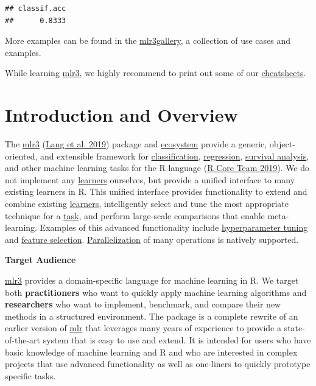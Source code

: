 \documentclass[
]{scrbook}
\newenvironment{Shaded}{\begin{snugshade}}{\end{snugshade}}
\newcommand{\CommentTok}[1]{\textcolor[rgb]{0.56,0.35,0.01}{\textit{#1}}}
\newcommand{\FunctionTok}[1]{\textcolor[rgb]{0.00,0.00,0.00}{#1}}
\newcommand{\NormalTok}[1]{#1}
\newcommand{\SpecialCharTok}[1]{\textcolor[rgb]{0.00,0.00,0.00}{#1}}
\newcommand{\StringTok}[1]{\textcolor[rgb]{0.31,0.60,0.02}{#1}}
\renewenvironment{Shaded} {\begin{snugshade}\small} {\end{snugshade}}
\begin{document}
\begin{Shaded}
\end{Shaded}

\begin{verbatim}
## classif.acc 
##      0.8333
\end{verbatim}

More examples can be found in the \href{https://mlr3gallery.mlr-org.com}{mlr3gallery}, a collection of use cases and examples.

While learning \href{https://mlr3.mlr-org.com}{mlr3}, we highly recommend to print out some of our \href{https://cheatsheets.mlr-org.com}{cheatsheets}.

\hypertarget{introduction}{%
\chapter{Introduction and Overview}\label{introduction}}

The \href{https://mlr3.mlr-org.com}{mlr3} (\protect\hyperlink{ref-mlr3}{Lang et al. 2019}) package and \href{https://github.com/mlr-org/mlr3/wiki/Extension-Packages}{ecosystem} provide a generic, object-oriented, and extensible framework for \protect\hyperlink{tasks}{classification}, \protect\hyperlink{tasks}{regression}, \protect\hyperlink{survival}{survival analysis}, and other machine learning tasks for the R language (\protect\hyperlink{ref-R}{R Core Team 2019}).
We do not implement any \protect\hyperlink{learners}{learners} ourselves, but provide a unified interface to many existing learners in R.
This unified interface provides functionality to extend and combine existing \protect\hyperlink{learners}{learners}, intelligently select and tune the most appropriate technique for a \protect\hyperlink{tasks}{task}, and perform large-scale comparisons that enable meta-learning.
Examples of this advanced functionality include \protect\hyperlink{tuning}{hyperparameter tuning} and \protect\hyperlink{fs}{feature selection}. \protect\hyperlink{parallelization}{Parallelization} of many operations is natively supported.

\textbf{Target Audience}

\href{https://mlr3.mlr-org.com}{mlr3} provides a domain-specific language for machine learning in R.
We target both \textbf{practitioners} who want to quickly apply machine learning algorithms and \textbf{researchers} who want to implement, benchmark, and compare their new methods in a structured environment.
The package is a complete rewrite of an earlier version of \href{https://mlr.mlr-org.com}{mlr} that leverages many years of experience to provide a state-of-the-art system that is easy to use and extend.
It is intended for users who have basic knowledge of machine learning and R and who are interested in complex projects that use advanced functionality as well as one-liners to quickly prototype specific tasks.
\end{document}
